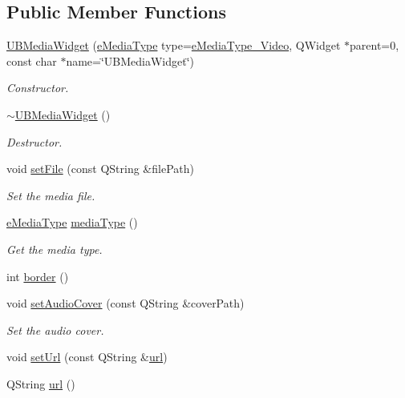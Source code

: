\subsection*{Public Member Functions}
\begin{DoxyCompactItemize}
\item 
\hyperlink{class_u_b_media_widget_a0187e8e7030cfa09ad4728e9edea5166}{U\-B\-Media\-Widget} (\hyperlink{_u_b_media_widget_8h_ae77abac744002ced1ee359ba04878301}{e\-Media\-Type} type=\hyperlink{_u_b_media_widget_8h_ae77abac744002ced1ee359ba04878301a9f2c32894f0302fe064a7c49e115f36d}{e\-Media\-Type\-\_\-\-Video}, Q\-Widget $\ast$parent=0, const char $\ast$name=\char`\"{}U\-B\-Media\-Widget\char`\"{})
\begin{DoxyCompactList}\small\item\em Constructor. \end{DoxyCompactList}\item 
\hyperlink{class_u_b_media_widget_a45edb866993df6670dfff9a797e91079}{$\sim$\-U\-B\-Media\-Widget} ()
\begin{DoxyCompactList}\small\item\em Destructor. \end{DoxyCompactList}\item 
void \hyperlink{class_u_b_media_widget_a8f425d00b17a1f705d8b48768053b0ea}{set\-File} (const Q\-String \&file\-Path)
\begin{DoxyCompactList}\small\item\em Set the media file. \end{DoxyCompactList}\item 
\hyperlink{_u_b_media_widget_8h_ae77abac744002ced1ee359ba04878301}{e\-Media\-Type} \hyperlink{class_u_b_media_widget_ad893b07a17c5f947229767b8e1b9336c}{media\-Type} ()
\begin{DoxyCompactList}\small\item\em Get the media type. \end{DoxyCompactList}\item 
int \hyperlink{class_u_b_media_widget_a23c586a5fc10e1ba841e72aba33c2823}{border} ()
\item 
void \hyperlink{class_u_b_media_widget_a42122f762e8bc5891e542f4bdf947c44}{set\-Audio\-Cover} (const Q\-String \&cover\-Path)
\begin{DoxyCompactList}\small\item\em Set the audio cover. \end{DoxyCompactList}\item 
void \hyperlink{class_u_b_media_widget_adb144258e57138f696b7420370422367}{set\-Url} (const Q\-String \&\hyperlink{class_u_b_media_widget_a3811e4d8d152cf88ebf389448d765268}{url})
\item 
Q\-String \hyperlink{class_u_b_media_widget_a3811e4d8d152cf88ebf389448d765268}{url} ()
\end{DoxyCompactItemize}
